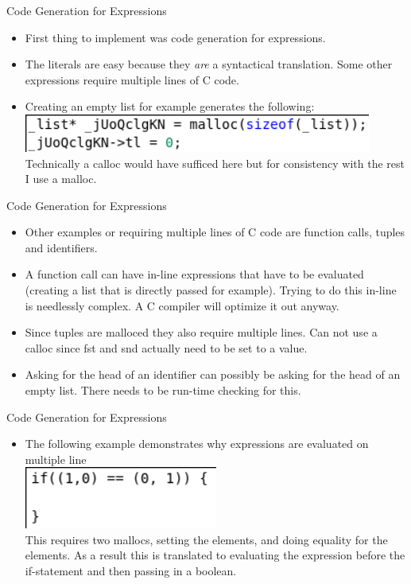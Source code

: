 \documentclass[10pt]{beamer}
\begin{document}
\begin{frame}{Code Generation for Expressions}
    \begin{itemize}
        \item First thing to implement was code generation for expressions.
        \item The literals are easy because they \textit{are} a syntactical translation. Some other expressions require multiple lines of C code.
        \item Creating an empty list for example generates the following:
        \includegraphics[width=0.9\textwidth]{presentation4/2.png}\\
        Technically a calloc would have sufficed here but for consistency with the rest I use a malloc.
    \end{itemize}
\end{frame}

\begin{frame}{Code Generation for Expressions}
    \begin{itemize}
        \item Other examples or requiring multiple lines of C code are function calls, tuples and identifiers.
        \item A function call can have in-line expressions that have to be evaluated (creating a list that is directly passed for example). Trying to do this in-line is needlessly complex. A C compiler will optimize it out anyway.
        \item Since tuples are malloced they also require multiple lines. Can not use a calloc since fst and snd actually need to be set to a value.
        \item Asking for the head of an identifier can possibly be asking for the head of an empty list. There needs to be run-time checking for this.
    \end{itemize}
\end{frame}

\begin{frame}{Code Generation for Expressions}
    \begin{itemize}
        \item The following example demonstrates why expressions are evaluated on multiple line\\
        \includegraphics[width=0.5\textwidth]{presentation4/3.png}\\
        This requires two mallocs, setting the elements, and doing equality for the elements. As a result this is translated to evaluating the expression before the if-statement and then passing in a boolean.
    \end{itemize}
\end{frame}
\end{document}
